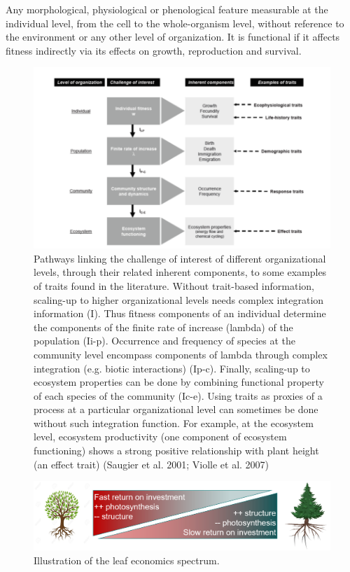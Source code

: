 \documentclass[12pt,oneside]{book}
\begin{document}
Any morphological, physiological or phenological feature measurable at
the individual level, from the cell to the whole-organism level, without
reference to the environment or any other level of organization. It is
functional if it affects fitness indirectly via its effects on growth,
reproduction and survival.

\begin{figure}

{\centering \includegraphics[width=0.8\linewidth]{figures/chap7/f73_violle2} 

}

\caption{Pathways linking the challenge of interest of different organizational levels, through their related inherent components, to some examples of traits found in the literature. Without trait-based information, scaling-up to higher organizational levels needs complex integration information (I). Thus fitness components of an individual determine the components of the finite rate of increase (lambda) of the population (Ii-p). Occurrence and frequency of species at the community level encompass components of lambda through complex integration (e.g. biotic interactions) (Ip-c). Finally, scaling-up to ecosystem properties can be done by combining functional property of each species of the community (Ic-e). Using traits as proxies of a process at a particular organizational level can sometimes be done without such integration function. For example, at the ecosystem level, ecosystem productivity (one component of ecosystem functioning) shows a strong positive relationship with plant height (an effect trait) (Saugier et al. 2001; Violle et al. 2007)}\label{fig:f73}
\end{figure}

\begin{figure}

{\centering \includegraphics[width=0.8\linewidth]{figures/chap7/f74_LES} 

}

\caption{Illustration of the leaf economics spectrum.}\label{fig:f74}
\end{figure}
\end{document}
